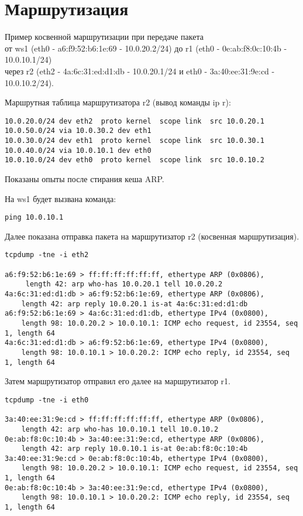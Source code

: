 \documentclass[a4paper,12pt]{article}
\begin{document}
\section{Маршрутизация}

Пример косвенной маршрутизации при передаче пакета \\
от ws1 (eth0 - a6:f9:52:b6:1e:69 - 10.0.20.2/24) 
до r1 (eth0 - 0e:ab:f8:0c:10:4b - 10.0.10.1/24)\\
через r2 (eth2 - 4a:6c:31:ed:d1:db - 10.0.20.1/24 и eth0 - 3a:40:ee:31:9e:cd - 10.0.10.2/24).

Маршрутная таблица маршрутизатора r2 (вывод команды ip r):

\begin{Verbatim}
10.0.20.0/24 dev eth2  proto kernel  scope link  src 10.0.20.1 
10.0.50.0/24 via 10.0.30.2 dev eth1 
10.0.30.0/24 dev eth1  proto kernel  scope link  src 10.0.30.1 
10.0.40.0/24 via 10.0.10.1 dev eth0 
10.0.10.0/24 dev eth0  proto kernel  scope link  src 10.0.10.2 
\end{Verbatim}

Показаны опыты после стирания кеша ARP.

На ws1 будет вызвана команда:
\begin{Verbatim}
ping 10.0.10.1
\end{Verbatim}

Далее показана отправка пакета на маршрутизатор r2 (косвенная маршрутизация). 

\begin{Verbatim}
tcpdump -tne -i eth2

a6:f9:52:b6:1e:69 > ff:ff:ff:ff:ff:ff, ethertype ARP (0x0806), 
     length 42: arp who-has 10.0.20.1 tell 10.0.20.2
4a:6c:31:ed:d1:db > a6:f9:52:b6:1e:69, ethertype ARP (0x0806), 
    length 42: arp reply 10.0.20.1 is-at 4a:6c:31:ed:d1:db
a6:f9:52:b6:1e:69 > 4a:6c:31:ed:d1:db, ethertype IPv4 (0x0800), 
    length 98: 10.0.20.2 > 10.0.10.1: ICMP echo request, id 23554, seq 1, length 64
4a:6c:31:ed:d1:db > a6:f9:52:b6:1e:69, ethertype IPv4 (0x0800), 
    length 98: 10.0.10.1 > 10.0.20.2: ICMP echo reply, id 23554, seq 1, length 64
\end{Verbatim}

Затем маршрутизатор отправил его далее на маршрутизатор r1.

\begin{Verbatim}
tcpdump -tne -i eth0

3a:40:ee:31:9e:cd > ff:ff:ff:ff:ff:ff, ethertype ARP (0x0806), 
    length 42: arp who-has 10.0.10.1 tell 10.0.10.2
0e:ab:f8:0c:10:4b > 3a:40:ee:31:9e:cd, ethertype ARP (0x0806), 
    length 42: arp reply 10.0.10.1 is-at 0e:ab:f8:0c:10:4b
3a:40:ee:31:9e:cd > 0e:ab:f8:0c:10:4b, ethertype IPv4 (0x0800), 
    length 98: 10.0.20.2 > 10.0.10.1: ICMP echo request, id 23554, seq 1, length 64
0e:ab:f8:0c:10:4b > 3a:40:ee:31:9e:cd, ethertype IPv4 (0x0800), 
    length 98: 10.0.10.1 > 10.0.20.2: ICMP echo reply, id 23554, seq 1, length 64
\end{Verbatim}
\end{document}
